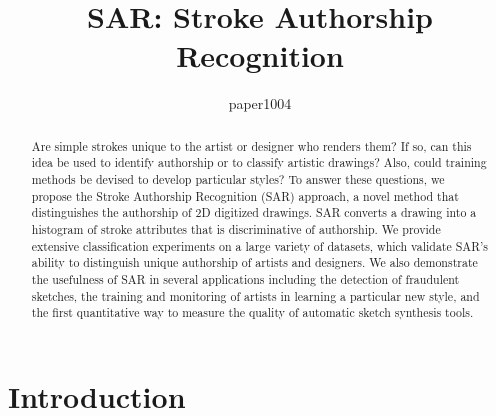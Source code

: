 \documentclass{egpubl}
\title[SAR: Stroke Authorship Recognition]%
      {SAR: Stroke Authorship Recognition}
\author[paper1004]
     {paper1004}
\begin{document}

\maketitle

\begin{abstract}
Are simple strokes unique to the artist or designer who renders them? If so, can this idea be used to identify authorship or to classify artistic drawings? Also, could training methods be devised to develop particular styles? To answer these questions, we propose the Stroke Authorship Recognition (SAR) approach, a novel method that distinguishes the authorship of 2D digitized drawings. SAR converts a drawing into a histogram of stroke attributes that is discriminative of authorship. We provide extensive classification experiments on a large variety of datasets, which validate SAR's ability to distinguish unique authorship of artists and designers. We also demonstrate the usefulness of SAR in several applications including the detection of  fraudulent sketches, the training and monitoring of artists in learning a particular new style, and the first quantitative way to measure the quality of automatic sketch synthesis tools.\vspace{-1mm}
\end{abstract}
\vspace{-5mm}
\section{Introduction}
\vspace{-2mm}

\end{document}
